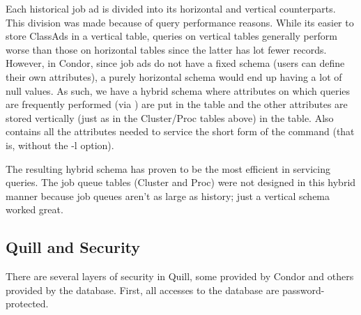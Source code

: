 Each historical job ad is divided into its horizontal and vertical
counterparts.  This division was made because of query performance
reasons.  While its easier to store ClassAds in a vertical table,
queries on vertical tables generally perform worse than those on
horizontal tables since the latter has lot fewer records.  However, in
Condor, since job ads do not have a fixed schema (users can define their
own attributes), a purely horizontal schema would end up having a lot
of null values. As such, we have a hybrid schema where attributes on
which queries are frequently performed (via ) are put
in the  table and the other attributes
are stored vertically (just as in the Cluster/Proc tables above) in the
 table. Also 
contains all the attributes needed to service the short form of the
 command (that is, without the -l option).

The resulting hybrid schema has proven to be the most efficient in
servicing  queries.  The job queue tables (Cluster and
Proc) were not designed in this hybrid manner because job queues aren't
as large as history; just a vertical schema worked great.


\subsection{\label{sec:Quill-Security}Quill and Security}

There are several layers of security in Quill, some provided by Condor and
others provided by the database.  First, all accesses to the database
are password-protected.

